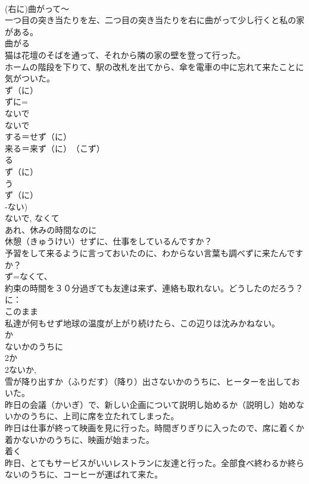 \documentclass[8pt]{extreport}
\begin{document}
\begin{CJK}{UTF8}{min}
\\	(右に)曲がって～
\\	一つ目の突き当たりを左、二つ目の突き当たりを右に曲がって少し行くと私の家がある。
\\	曲がる 
\\	猫は花壇のそばを通って、それから隣の家の壁を登って行った。
\\	ホームの階段を下りて、駅の改札を出てから、傘を電車の中に忘れて来たことに気がついた。
\\	ず（に）
\\	ずに=
\\	ないで
\\	ないで
\\	する＝せず（に）
\\	来る＝来ず（に）　（こず）
\\	る
\\	ず（に）
\\	う
\\	ず（に） 
\\	-ない)
\\	ないで, なくて 
\\	あれ、休みの時間なのに
\\	休憩（きゅうけい）せずに、仕事をしているんですか？
\\	予習をして来るように言っておいたのに、わからない言葉も調べずに来たんですか？
\\	ず=なくて、
\\	約束の時間を３０分過ぎても友達は来ず、連絡も取れない。どうしたのだろう？
\\	に：
\\	このまま
\\	私達が何もせず地球の温度が上がり続けたら、この辺りは沈みかねない。
\\	か
\\	ないかのうちに
\\	2か
\\	2ないか, 
\\	雪が降り出すか（ふりだす）（降り）出さないかのうちに、ヒーターを出しておいた。
\\	昨日の会議（かいぎ）で、新しい企画について説明し始めるか（説明し）始めないかのうちに、上司に席を立たれてしまった。
\\	昨日は仕事が終って映画を見に行った。時間ぎりぎりに入ったので、席に着くか着かないかのうちに、映画が始まった。
\\	着く 
\\	昨日、とてもサービスがいいレストランに友達と行った。全部食べ終わるか終らないのうちに、コーヒーが運ばれて来た。

\end{CJK}
\end{document}
